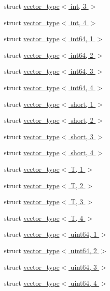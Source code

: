 \begin{DoxyCompactItemize}
struct \hyperlink{structcugar_1_1vector__type_3_01int_00_013_01_4}{vector\+\_\+type$<$ int, 3 $>$}
\item 
struct \hyperlink{structcugar_1_1vector__type_3_01int_00_014_01_4}{vector\+\_\+type$<$ int, 4 $>$}
\item 
struct \hyperlink{structcugar_1_1vector__type_3_01int64_00_011_01_4}{vector\+\_\+type$<$ int64, 1 $>$}
\item 
struct \hyperlink{structcugar_1_1vector__type_3_01int64_00_012_01_4}{vector\+\_\+type$<$ int64, 2 $>$}
\item 
struct \hyperlink{structcugar_1_1vector__type_3_01int64_00_013_01_4}{vector\+\_\+type$<$ int64, 3 $>$}
\item 
struct \hyperlink{structcugar_1_1vector__type_3_01int64_00_014_01_4}{vector\+\_\+type$<$ int64, 4 $>$}
\item 
struct \hyperlink{structcugar_1_1vector__type_3_01short_00_011_01_4}{vector\+\_\+type$<$ short, 1 $>$}
\item 
struct \hyperlink{structcugar_1_1vector__type_3_01short_00_012_01_4}{vector\+\_\+type$<$ short, 2 $>$}
\item 
struct \hyperlink{structcugar_1_1vector__type_3_01short_00_013_01_4}{vector\+\_\+type$<$ short, 3 $>$}
\item 
struct \hyperlink{structcugar_1_1vector__type_3_01short_00_014_01_4}{vector\+\_\+type$<$ short, 4 $>$}
\item 
struct \hyperlink{structcugar_1_1vector__type_3_01_t_00_011_01_4}{vector\+\_\+type$<$ T, 1 $>$}
\item 
struct \hyperlink{structcugar_1_1vector__type_3_01_t_00_012_01_4}{vector\+\_\+type$<$ T, 2 $>$}
\item 
struct \hyperlink{structcugar_1_1vector__type_3_01_t_00_013_01_4}{vector\+\_\+type$<$ T, 3 $>$}
\item 
struct \hyperlink{structcugar_1_1vector__type_3_01_t_00_014_01_4}{vector\+\_\+type$<$ T, 4 $>$}
\item 
struct \hyperlink{structcugar_1_1vector__type_3_01uint64_00_011_01_4}{vector\+\_\+type$<$ uint64, 1 $>$}
\item 
struct \hyperlink{structcugar_1_1vector__type_3_01uint64_00_012_01_4}{vector\+\_\+type$<$ uint64, 2 $>$}
\item 
struct \hyperlink{structcugar_1_1vector__type_3_01uint64_00_013_01_4}{vector\+\_\+type$<$ uint64, 3 $>$}
\item 
struct \hyperlink{structcugar_1_1vector__type_3_01uint64_00_014_01_4}{vector\+\_\+type$<$ uint64, 4 $>$}

\end{DoxyCompactItemize}
